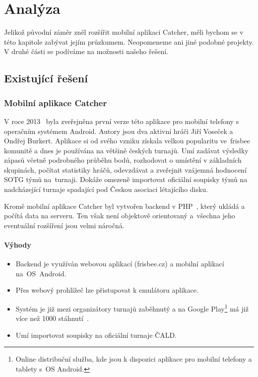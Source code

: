 \chapter{Analýza}

Jelikož původní záměr zněl rozšířit mobilní aplikaci Catcher,
měli bychom se v této kapitole zabývat jejím průzkumem. Neopomeneme ani jiné podobné projekty.
V druhé části se podíváme na možnosti našeho řešení.

\section{Existující řešení}

\subsection*{Mobilní aplikace Catcher}

V roce 2013~\cite{cald_catcher} byla zveřejněna první verze této aplikace pro mobilní telefony s operačním systémem Android.
Autory jsou dva aktivní hráči Jiří Voseček a Ondřej Burkert. Aplikace si od svého vzniku získala velkou popularitu
ve~frisbee komunitě a dnes je používána na většině českých turnajů. Umí zadávat výsledky
zápasů včetně podrobného průběhu bodů, rozhodovat o umístění v základních skupinách, počítat statistiky hráčů,
odevzdávat a zveřejnit vzájemná hodnocení SOTG týmů na~turnaji. Dokáže omezeně importovat oficiální soupisky týmů
na nadcházející turnaje spadající pod Českou asociaci létajícího disku.

Kromě mobilní aplikace Catcher byl vytvořen backend v PHP~\cite{php}, který ukládá a počítá data na serveru. Ten však není
objektově orientovaný a~všechna jeho eventuální rozšíření jsou velmi náročná.

\subsubsection*{Výhody}
\begin{itemize}
  \item Backend je využíván webovou aplikací (frisbee.cz) a mobilní aplikací na~OS~Android.
  \item Přes webový prohlížeč lze přistupovat k emulátoru aplikace.
  \item Systém je již mezi organizátory turnajů zaběhnutý a na Google Play\footnote{Online distribuční služba,
    kde jsou k dispozici aplikace pro mobilní telefony a tablety s~OS Android.}
    má již více než 1000 stáhnutí~\cite{catcher_play}.
  \item Umí importovat soupisky na oficiální turnaje ČALD.
\end{itemize}

